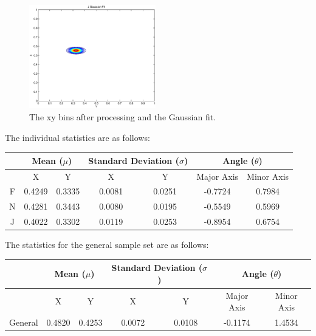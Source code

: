 \begin{figure}[h!]
    \includegraphics[width=0.49\textwidth]{Chapter2/Figs/JHands_XY_gFit.eps}
    \caption{The xy bins after processing and the Gaussian fit.}  \label{fig:FBinAndGFit}
\end{figure}

The individual statistics are as follows:
\newline

\begin{tabular}{|c|c|c|c|c|c|c|}
\hline
& \multicolumn{2}{|c|}{Mean ($\mu$)} & \multicolumn{2}{|c|}{Standard Deviation ($\sigma$)} & \multicolumn{2}{|c|}{Angle ($\theta$)} \\\hline
& X & Y & X & Y & Major Axis & Minor Axis \\\hline
F & 0.4249 & 0.3335 & 0.0081 & 0.0251 & -0.7724 & 0.7984 \\\hline
N & 0.4281 & 0.3443 & 0.0080 & 0.0195 & -0.5549 & 0.5969 \\\hline
J & 0.4022 & 0.3302 & 0.0119 & 0.0253 & -0.8954 & 0.6754 \\\hline
\end{tabular}
\newline
\vspace{0.5 cm}
\newline
The statistics for the general sample set are as follows:
\newline

\begin{tabular}{|c|c|c|c|c|c|c|}
\hline
& \multicolumn{2}{|c|}{Mean ($\mu$)} & \multicolumn{2}{|c|}{Standard Deviation ($\sigma$)} & \multicolumn{2}{|c|}{Angle ($\theta$)} \\\hline
& X & Y & X & Y & Major Axis & Minor Axis \\\hline
General & 0.4820 & 0.4253 & 0.0072 & 0.0108 & -0.1174 & 1.4534 \\\hline
\end{tabular}



